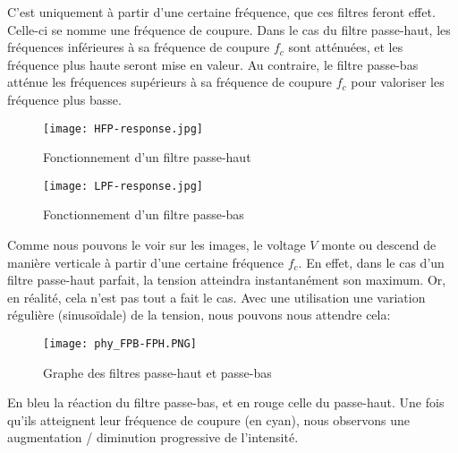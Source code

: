C'est uniquement à partir d'une certaine fréquence, que ces filtres feront effet. Celle-ci se nomme une fréquence de coupure.
Dans le cas du filtre passe-haut, les fréquences inférieures à sa fréquence de coupure $f_c$ sont atténuées, et les fréquence plus haute seront mise en valeur.
Au contraire, le filtre passe-bas atténue les fréquences supérieurs à sa fréquence de coupure $f_c$ pour valoriser les fréquence plus basse.

\begin{figure}[H]
  \centering
  \begin{minipage}[b]{0.4\textwidth}
    \texttt{[image: HFP-response.jpg]}
    \caption[Fonctionnement d'un filtre passe-haut]{Fonctionnement d'un filtre passe-haut}
  \end{minipage}
  \hfill
  \begin{minipage}[b]{0.4\textwidth}
    \texttt{[image: LPF-response.jpg]}
    \caption[Fonctionnement d'un filtre passe-bas]{Fonctionnement d'un filtre passe-bas \footnotemark}
  \end{minipage}
\end{figure}

Comme nous pouvons le voir sur les images, le voltage $V$ monte ou descend de manière verticale à partir d'une certaine fréquence $f_c$. En effet, dans le cas d'un filtre passe-haut parfait, la tension atteindra instantanément son maximum. Or, en réalité, cela n'est pas tout a fait le cas. Avec une utilisation une variation régulière (sinusoïdale) de la tension, nous pouvons nous attendre cela:

\begin{figure}[H]
  \centering
    \texttt{[image: phy\_FPB-FPH.PNG]}
    \caption{Graphe des filtres passe-haut et passe-bas}
\end{figure}

En bleu la réaction du filtre passe-bas, et en rouge celle du passe-haut. Une fois qu'ils atteignent leur fréquence de coupure (en cyan), nous observons une augmentation / diminution progressive de l'intensité.\\

